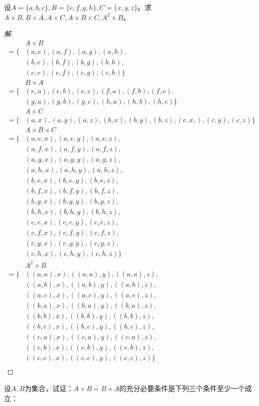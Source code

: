 \documentclass{article}
\begin{document}
\begin{CJK}{UTF8}{gbsn}
\begin{Exercise}
  设$A=\{a,b,c\}, B=\{e,f,g,h\}, C=\{x,y,z\}$。求$A\times B, B\times A, A\times C, A\times B \times C, A^2\times B$。
\end{Exercise}
\begin{proof}[解]
  \begin{align*}
    &A\times B\\
    =\{&(a,e),(a,f),(a,g),(a,h),\\
    &(b,e),(b,f),(b,g),(b,h),\\
    &(c,e),(c,f),(c,g),(c,h)\}\\ 
      &B\times A\\
      =\{&(e,a),(e,b),(e,c),
      (f,a),(f,b),(f,c),\\
      &(g,a),(g,b),(g,c),
      (h,a),(h,b),(h,c)\}\\   
        &A\times C\\
        =\{&(a,x),(a,y),(a,z),
        (b,x),(b,y),(b,z),  
      (c,x,),(c,y),(c,z) 
  \}\\ 
        &A\times B\times C\\ 
        =\{ & (a,e,x),(a,e,y),(a,e,z),\\ 
        &(a,f,x),(a,f,y),(a,f,z),\\ 
        &(a,g,x),(a,g,y),(a,g,z),\\ 
        &(a,h,x),(a,h,y),(a,h,z),\\ 
        & (b,e,x),(b,e,y),(b,e,z),\\ 
        &(b,f,x),(b,f,y),(b,f,z),\\ 
        &(b,g,x),(b,g,y),(b,g,z),\\ 
        &(b,h,x),(b,h,y),(b,h,z),\\ 
        & (c,e,x),(c,e,y),(c,e,z),\\ 
        &(c,f,x),(c,f,y),(c,f,z),\\ 
        &(c,g,x),(c,g,y),(c,g,z),\\ 
        &(c,h,x),(c,h,y),(c,h,z)\}\\
        &A^2\times B\\ 
        =\{ & ((a,a),x), ((a,a), y), ((a,a),z),\\ 
        &((a,b),x), ((a,b), y), ((a,b), z), \\ 
        &((a,c), x), ((a,c), y), ((a, c), z), \\ 
        & ((b,a),x), ((b,a), y), ((b,a),z),\\ 
        &((b,b),x), ((b,b), y), ((b,b), z), \\ 
        &((b,c), x), ((b,c), y), ((b, c), z), \\ 
        & ((c,a),x), ((c, a), y), ((c,a),z),\\ 
        &((c,b),x), ((c,b), y), ((c,b), z), \\ 
        &((c,c), x), ((c,c), y), ((c, c), z) \}\\
  \end{align*}
\end{proof}
\begin{Exercise}
  设$A,B$为集合，试证：$A\times B= B\times A$的充分必要条件是下列三个条件至少一个成立：


\end{Exercise}
\end{CJK}
\end{document}
